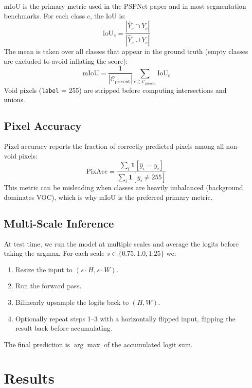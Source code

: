 \documentclass[12pt,a4paper]{article}
\newcommand{\code}[1]{\texttt{#1}}
\begin{document}
mIoU is the primary metric used in the PSPNet paper and in most segmentation
benchmarks.  For each class $c$, the IoU is:
\[
    \text{IoU}_c = \frac{|\hat{Y}_c \cap Y_c|}{|\hat{Y}_c \cup Y_c|}
\]
The mean is taken over all classes that appear in the ground truth
(empty classes are excluded to avoid inflating the score):
\[
    \text{mIoU} = \frac{1}{|\mathcal{C}_{\text{present}}|}
                  \sum_{c \in \mathcal{C}_{\text{present}}} \text{IoU}_c
\]
Void pixels (\code{label} = 255) are stripped before computing intersections
and unions.

\subsection{Pixel Accuracy}

Pixel accuracy reports the fraction of correctly predicted pixels among all
non-void pixels:
\[
    \text{PixAcc} = \frac{\sum_i \mathbf{1}[\hat{y}_i = y_i]}
                         {\sum_i \mathbf{1}[y_i \neq 255]}
\]
This metric can be misleading when classes are heavily imbalanced (background
dominates VOC), which is why mIoU is the preferred primary metric.

\subsection{Multi-Scale Inference}

At test time, we run the model at multiple scales and average the logits
before taking the argmax.  For each scale $s \in \{0.75, 1.0, 1.25\}$ we:
\begin{enumerate}[noitemsep]
    \item Resize the input to $(s \cdot H, s \cdot W)$.
    \item Run the forward pass.
    \item Bilinearly upsample the logits back to $(H, W)$.
    \item Optionally repeat steps 1--3 with a horizontally flipped input,
          flipping the result back before accumulating.
\end{enumerate}
The final prediction is $\arg\max$ of the accumulated logit sum.

\section{Results}
\end{document}
